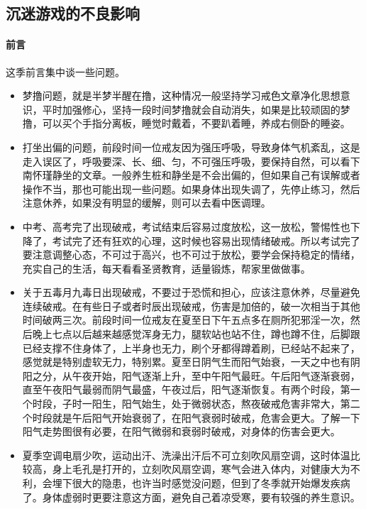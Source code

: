 \subsection{沉迷游戏的不良影响}

\paragraph{前言}

这季前言集中谈一些问题。

\begin{itemize}
    \item 梦撸问题，就是半梦半醒在撸，这种情况一般坚持学习戒色文章净化思想意识，平时加强修心，坚持一段时间梦撸就会自动消失，如果是比较顽固的梦撸，可以买个手指分离板，睡觉时戴着，不要趴着睡，养成右侧卧的睡姿。
    \item 打坐出偏的问题，前段时间一位戒友因为强压呼吸，导致身体气机紊乱，这是走入误区了，呼吸要深、长、细、匀，不可强压呼吸，要保持自然，可以看下南怀瑾静坐的文章。一般养生桩和静坐是不会出偏的，但如果自己有误解或者操作不当，那也可能出现一些问题。如果身体出现失调了，先停止练习，然后注意休养，如果没有明显的缓解，则可以去看中医调理。
    \item 中考、高考完了出现破戒，考试结束后容易过度放松，这一放松，警惕性也下降了，考试完了还有狂欢的心理，这时候也容易出现情绪破戒。所以考试完了要注意调整心态，不可过于高兴，也不可过于放松，要学会保持稳定的情绪，充实自己的生活，每天看看圣贤教育，适量锻炼，帮家里做做事。
    \item 关于五毒月九毒日出现破戒，不要过于恐慌和担心，应该注意休养，尽量避免连续破戒。在有些日子或者时辰出现破戒，伤害是加倍的，破一次相当于其他时间破两三次。前段时间一位戒友在夏至日下午五点多在厕所犯邪淫一次，然后晚上七点以后越来越感觉浑身无力，腿软站也站不住，蹲也蹲不住，后脚跟已经支撑不住身体了，上半身也无力，刷个牙都得蹲着刷，已经站不起来了，感觉就是特别虚软无力，特别累。夏至日阴气生而阳气始衰，一天之中也有阴阳之分，从午夜开始，阳气逐渐上升，至中午阳气最旺。午后阳气逐渐衰弱，直至午夜阳气最弱而阴气最盛，午夜过后，阳气逐渐恢复。有两个时段，第一个时段，子时一阳生，阳气始生，处于微弱状态，熬夜破戒危害非常大，第二个时段就是午后阳气开始衰弱了，在阳气衰弱时破戒，危害会更大。了解一下阳气走势图很有必要，在阳气微弱和衰弱时破戒，对身体的伤害会更大。
    \item 夏季空调电扇少吹，运动出汗、洗澡出汗后不可立刻吹风扇空调，这时体温比较高，身上毛孔是打开的，立刻吹风扇空调，寒气会进入体内，对健康大为不利，会埋下很大的隐患，也许当时感觉没问题，但到了冬季就开始爆发疾病了。身体虚弱时更要注意这方面，避免自己着凉受寒，要有较强的养生意识。

\end{itemize}
